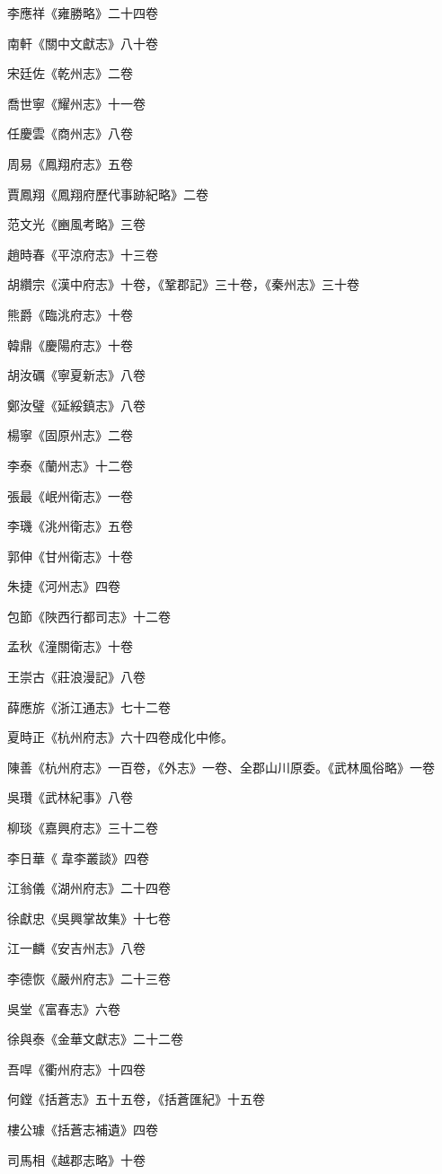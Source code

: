 李應祥《雍勝略》二十四卷

南軒《關中文獻志》八十卷

宋廷佐《乾州志》二卷

喬世寧《耀州志》十一卷

任慶雲《商州志》八卷

周易《鳳翔府志》五卷

賈鳳翔《鳳翔府歷代事跡紀略》二卷

范文光《豳風考略》三卷

趙時春《平涼府志》十三卷

胡纘宗《漢中府志》十卷，《鞏郡記》三十卷，《秦州志》三十卷

熊爵《臨洮府志》十卷

韓鼎《慶陽府志》十卷

胡汝礪《寧夏新志》八卷

鄭汝璧《延綏鎮志》八卷

楊寧《固原州志》二卷

李泰《蘭州志》十二卷

張最《岷州衛志》一卷

李璣《洮州衛志》五卷

郭伸《甘州衛志》十卷

朱捷《河州志》四卷

包節《陜西行都司志》十二卷

孟秋《潼關衛志》十卷

王崇古《莊浪漫記》八卷

薛應旂《浙江通志》七十二卷

夏時正《杭州府志》六十四卷成化中修。

陳善《杭州府志》一百卷，《外志》一卷、全郡山川原委。《武林風俗略》一卷

吳瓚《武林紀事》八卷

柳琰《嘉興府志》三十二卷

李日華《韋李叢談》四卷

江翁儀《湖州府志》二十四卷

徐獻忠《吳興掌故集》十七卷

江一麟《安吉州志》八卷

李德恢《嚴州府志》二十三卷

吳堂《富春志》六卷

徐與泰《金華文獻志》二十二卷

吾哻《衢州府志》十四卷

何鏜《括蒼志》五十五卷，《括蒼匯紀》十五卷

樓公璩《括蒼志補遺》四卷

司馬相《越郡志略》十卷

